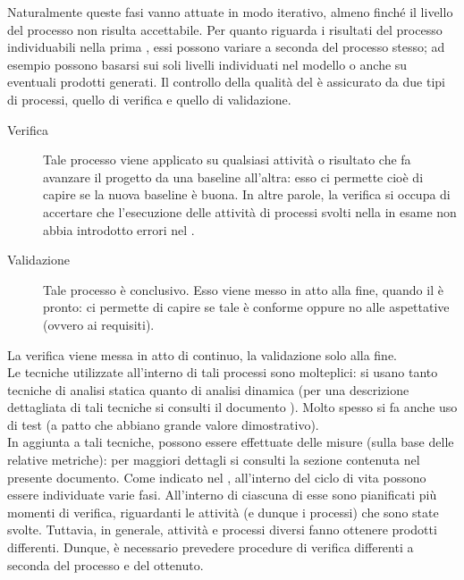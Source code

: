 		Naturalmente queste fasi vanno attuate in modo iterativo, almeno finché il livello del processo non risulta accettabile.
		Per quanto riguarda i risultati del processo individuabili nella prima , essi possono variare a seconda del processo stesso; ad esempio possono basarsi sui soli livelli individuati nel modello  o anche su eventuali prodotti generati.
		Il controllo della qualità del  è assicurato da due tipi di processi, quello di verifica e quello di validazione.
		\begin{description}
			\item[Verifica] Tale processo viene applicato su qualsiasi attività o risultato che fa avanzare il progetto da una baseline all'altra: esso 
			ci permette cioè di capire se la nuova baseline è buona. In altre parole, la verifica si occupa di accertare che l'esecuzione delle attività 
			di processi svolti nella  in esame non abbia introdotto errori nel .
			\item[Validazione] Tale processo è conclusivo. Esso viene messo in atto alla fine, quando il  è pronto: ci permette di capire se tale  è conforme oppure no alle aspettative (ovvero ai requisiti).
		\end{description}
		La verifica viene messa in atto di continuo, la validazione solo alla fine.\\
		Le tecniche utilizzate all'interno di tali processi sono molteplici: si usano tanto tecniche di analisi statica quanto di analisi dinamica (per una descrizione dettagliata di tali tecniche si consulti il documento ). Molto spesso si fa anche uso di test (a patto che abbiano grande valore dimostrativo).\\
		In aggiunta a tali tecniche, possono essere effettuate delle misure (sulla base delle relative metriche): per maggiori dettagli si consulti la sezione  contenuta nel presente documento.
		Come indicato nel , all'interno del ciclo di vita possono essere individuate varie fasi. All'interno di ciascuna di esse sono pianificati più momenti di verifica, riguardanti le attività (e dunque i processi) che sono state svolte. Tuttavia, in generale, attività e processi diversi fanno ottenere prodotti differenti. Dunque, è necessario prevedere procedure di verifica differenti a seconda del processo e del  ottenuto.\\
